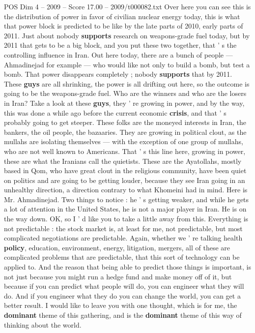 \begin{textsample}{POS Dim 4 – 2009 – Score 17.00 – 2009/t000082.txt}
Over here you can see this is the distribution of power in favor of civilian nuclear energy today, this is what that power block is predicted to be like by the late parts of 2010, early parts of 2011.
Just about nobody \textbf{supports} research on weapons-grade fuel today, but by 2011 that gets to be a big block, and you put these two together, that ' s the controlling influence in Iran.
Out here today, there are a bunch of people — Ahmadinejad for example — who would like not only to build a bomb, but test a bomb.
That power disappears completely ; nobody \textbf{supports} that by 2011.
These \textbf{guys} are all shrinking, the power is all drifting out here, so the outcome is going to be the weapons-grade fuel.
Who are the winners and who are the losers in Iran?
Take a look at these \textbf{guys}, they ' re growing in power, and by the way, this was done a while ago before the current economic \textbf{crisis}, and that ' s probably going to get steeper.
These folks are the moneyed interests in Iran, the bankers, the oil people, the bazaaries.
They are growing in political clout, as the mullahs are isolating themselves — with the exception of one group of mullahs, who are not well known to Americans.
That ' s this line here, growing in power, these are what the Iranians call the quietists.
These are the Ayatollahs, mostly based in Qom, who have great clout in the religious community, have been quiet on politics and are going to be getting louder, because they see Iran going in an unhealthy direction, a direction contrary to what Khomeini had in mind.
Here is Mr.
Ahmadinejad.
Two things to notice : he ' s getting weaker, and while he gets a lot of attention in the United States, he is not a major player in Iran.
He is on the way down.
OK, so I ' d like you to take a little away from this.
Everything is not predictable : the stock market is, at least for me, not predictable, but most complicated negotiations are predictable.
Again, whether we ' re talking health \textbf{policy}, education, environment, energy, litigation, mergers, all of these are complicated problems that are predictable, that this sort of technology can be applied to.
And the reason that being able to predict those things is important, is not just because you might run a hedge fund and make money off of it, but because if you can predict what people will do, you can engineer what they will do.
And if you engineer what they do you can change the world, you can get a better result.
I would like to leave you with one thought, which is for me, the \textbf{dominant} theme of this gathering, and is the \textbf{dominant} theme of this way of thinking about the world.

\end{textsample}
